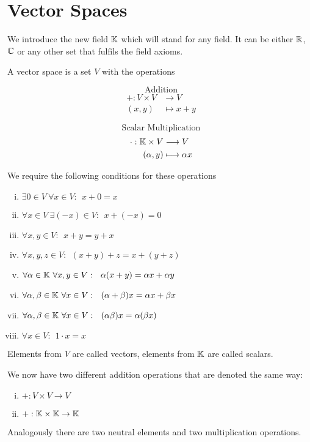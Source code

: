 \documentclass[../../script.tex]{subfiles}
\begin{document}
\section{Vector Spaces}
We introduce the new field $\mathbb{K}$ which will stand for any field. It can be either $\mathbb{R}$, $\mathbb{C}$ or any other set that fulfils the field axioms.

\begin{defi}
A vector space is a set $V$ with the operations

\noindent\begin{minipage}[t]{.5\linewidth}
\[
	\text{Addition} 
\]
\[
\begin{split}
	+: V \times V &\longrightarrow V \\
	(x, y) &\longmapsto x + y
\end{split}
\]
\end{minipage}
\begin{minipage}[t]{.5\linewidth}
\[
	\text{Scalar Multiplication} 
\]
\[
\begin{split}
	\cdot: \mathbb{K} \times V &\longrightarrow V \\
	(\alpha, y) &\longmapsto \alpha x
\end{split}
\]
\end{minipage}
We require the following conditions for these operations
\begin{enumerate}[(i)]
	\item $\exists 0 \in V ~\forall x \in V: ~~x + 0 = x$
	\item $\forall x \in V ~\exists (-x) \in V: ~~x + (-x) = 0$
	\item $\forall x, y \in V: ~~x + y = y + x$
	\item $\forall x, y, z \in V: ~~(x + y) + z = x + (y + z)$
	\item $\forall \alpha \in \mathbb{K} ~\forall x, y \in V: ~~\alpha (x + y) = \alpha x + \alpha y$
	\item $\forall \alpha, \beta \in \mathbb{K} ~\forall x \in V: ~~(\alpha + \beta)x = \alpha x + \beta x$
	\item $\forall \alpha, \beta \in \mathbb{K} ~\forall x \in V: ~~(\alpha\beta )x = \alpha(\beta x)$
	\item $\forall x \in V: ~~1 \cdot x = x$
\end{enumerate}
Elements from $V$ are called vectors, elements from $\mathbb{K}$ are called scalars.
\end{defi}

\begin{rem}
We now have two different addition operations that are denoted the same way:
\begin{enumerate}[(i)]
	\item $+: V \times V \rightarrow V$
	\item $+: \mathbb{K} \times \mathbb{K} \rightarrow \mathbb{K}$
\end{enumerate}
Analogously there are two neutral elements and two multiplication operations.
\end{rem}
\end{document}
